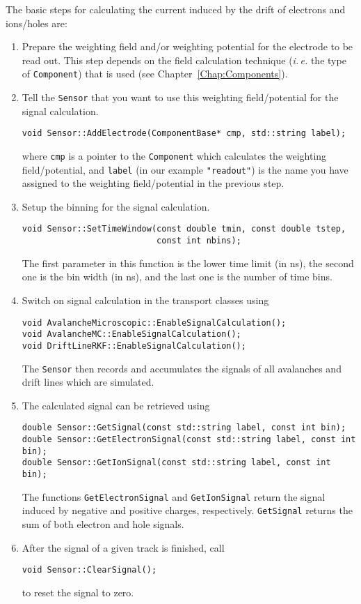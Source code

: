 The basic steps for calculating the current induced 
by the drift of electrons and ions/holes are:
\begin{enumerate}
  \item
  Prepare the weighting field and/or weighting potential 
  for the electrode to be read out. 
  This step depends on the field calculation technique 
  (\textit{i.\,e.} the type of \texttt{Component}) that is used 
  (see Chapter~\ref{Chap:Components}). 
  \item
  Tell the \texttt{Sensor} that you want to use this 
  weighting field/potential for the signal calculation. 
  \begin{lstlisting}
void Sensor::AddElectrode(ComponentBase* cmp, std::string label);
  \end{lstlisting}
  where \texttt{cmp} is a pointer to the \texttt{Component} 
  which calculates the weighting field/potential, and \texttt{label} 
  (in our example \texttt{"readout"}) is the name 
  you have assigned to the weighting field/potential in the previous step.
  \item
  Setup the binning for the signal calculation.
  \begin{lstlisting}
void Sensor::SetTimeWindow(const double tmin, const double tstep, 
                           const int nbins);
  \end{lstlisting}
  The first parameter in this function is the lower time limit (in ns), 
  the second one is the bin width (in ns), and the last one 
  is the number of time bins.
  \item
  Switch on signal calculation in the transport classes using 
  \begin{lstlisting}
void AvalancheMicroscopic::EnableSignalCalculation();
void AvalancheMC::EnableSignalCalculation();
void DriftLineRKF::EnableSignalCalculation();
  \end{lstlisting}
  The \texttt{Sensor} then records and accumulates the signals of all 
  avalanches and drift lines which are simulated.
  \item
  The calculated signal can be retrieved using 
  \begin{lstlisting}
double Sensor::GetSignal(const std::string label, const int bin);
double Sensor::GetElectronSignal(const std::string label, const int bin);
double Sensor::GetIonSignal(const std::string label, const int bin); 
  \end{lstlisting}
  The functions \texttt{GetElectronSignal} and 
  \texttt{GetIonSignal} return the signal induced by negative 
  and positive charges, respectively. \texttt{GetSignal} returns 
  the sum of both electron and hole signals.   
  \item
  After the signal of a given track is finished, call
  \begin{lstlisting}
void Sensor::ClearSignal();
  \end{lstlisting}
  to reset the signal to zero.
\end{enumerate}

